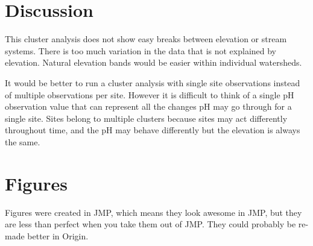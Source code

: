 \documentclass[11pt]{article} %
\begin{document}
\section{Discussion}

This cluster analysis does not show easy breaks between elevation or stream systems.  There is too much variation in the data that is not explained by elevation. Natural elevation bands would be easier within individual watersheds.

It would be better to run a cluster analysis with single site observations instead of multiple observations per site.  However it is difficult to think of a single pH observation value that can represent all the changes pH may go through for a single site.  Sites belong to multiple clusters because sites may act differently throughout time, and the pH may behave differently but the elevation is always the same.
\pagebreak

\section{Figures}
Figures were created in JMP, which means they look awesome in JMP, but they are less than perfect when you take them out of JMP.  They could probably be re-made better in Origin.

\pagebreak

\label{CAGraph1}


\label{CAGraph2}


\label{CAGraph3}


\label{CAGraph6}


\label{CAGraph8}


\label{CAGraph9}


\label{CAGraph10}

\end{document}
